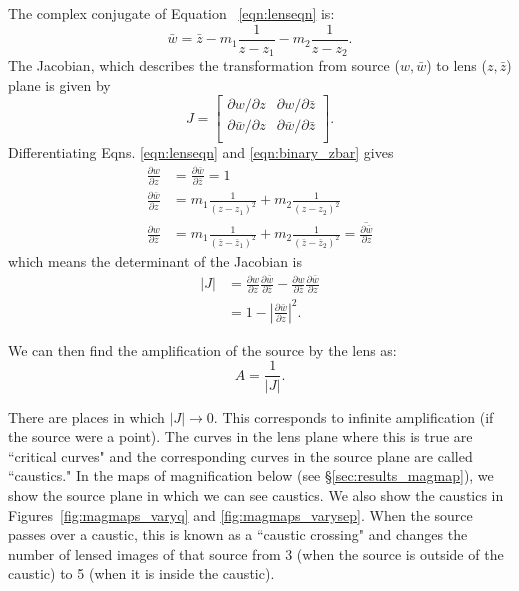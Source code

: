 \documentclass[twocolumn]{aastex701}
\begin{document}
The complex conjugate of Equation ~\ref{eqn:lenseqn} is:
\begin{equation}
    \bar{w} = \bar{z} - m_1 \frac{1}{z - z_1} - m_2 \frac{1}{z - z_2}.
    \label{eqn:binary_zbar}
\end{equation}
The Jacobian, which describes the transformation from source ($w, \bar{w}$) to lens ($z, \bar{z}$) plane is given by
\begin{equation}
    J = 
    \begin{bmatrix}
    \partial w / \partial z & \partial w / \partial \bar{z} \\
    \partial \bar{w} / \partial z & \partial \bar{w} / \partial \bar{z} \\
    \end{bmatrix}.
\end{equation}
Differentiating Eqns. \ref{eqn:lenseqn} and \ref{eqn:binary_zbar} gives
\begin{align}
    \frac{\partial w}{\partial z} &= \frac{\partial \bar{w}}{\partial \bar{z}} = 1 \\
    \frac{\partial \bar{w}}{\partial z} &= m_1 \frac{1}{(z - z_1)^2} + m_2 \frac{1}{(z - z_2)^2}\\
    \frac{\partial w}{\partial \bar{z}} &= m_1 \frac{1}{(\bar{z} - \bar{z}_1)^2} + m_2 \frac{1}{(\bar{z} - \bar{z}_2)^2} = \overline{\frac{\partial \bar{w}}{\partial z}}
\end{align}
which means the determinant of the Jacobian is
\begin{align}
    |J| &= \frac{\partial w}{\partial z} \frac{\partial \bar{w}}{\partial \bar{z}} - \frac{\partial w}{\partial \bar{z}} \frac{\partial \bar{w}}{\partial z} \\
    &= 1 - \left| \frac{\partial \bar{w}}{\partial z} \right|^2.
\end{align}

We can then find the amplification of the source by the lens as:
\begin{equation}
    A = \frac{1}{|J|}.
\end{equation}

There are places in which $|J| \rightarrow 0$. This corresponds to infinite amplification (if the source were a point). The curves in the lens plane where this is true are ``critical curves" and the corresponding curves in the source plane are called ``caustics." In the maps of magnification below (see \S\ref{sec:results_magmap}), we show the source plane in which we can see caustics. We also show the caustics in Figures~\ref{fig:magmaps_varyq} and \ref{fig:magmaps_varysep}. When the source passes over a caustic, this is known as a ``caustic crossing" and changes the number of lensed images of that source from 3 (when the source is outside of the caustic) to 5 (when it is inside the caustic).
\end{document}
